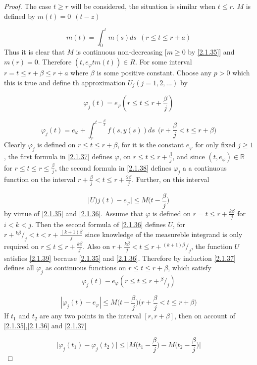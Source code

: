 \documentclass[a4 paper, 12pt]{report}
\newcommand*\rfrac[2]{{}^{#1}\!/_{#2}}
\theoremstyle{plain}
\begin{document}
\begin{proof}
The case $t\geq r$ will be considered, the situation is similar  when $t\leq r$. $M$ is defined by $m(t) = 0~~(t-z)$

\begin{equation}\label{2.1.36}
m(t) = \int_0^tm(s)ds~~(r\leq t\leq r+a)
\end{equation}
Thus it is clear that $M$ is continuous  non-decreasing $[m\geq 0$ by \eqref{2.1.35}] and $m(r) = 0$. Therefore $(t,e_\varphi tm(t))\in R$. For some interval $r = t\leq r+\beta\leq r+a$ where $\beta$ is some positive constant. Choose any $p>0$ which this is true and define th approximation $U_j(j = 1,2,\ldots)$ by

\begin{equation}\label{2.1.37}
\varphi_j(t) = e_\varphi(r\leq t\leq r+\frac{\beta}{j})
\end{equation}

\begin{equation}\label{2.1.38}
\varphi_j(t) = e_{\varphi}+\int_r^{t-\frac{\beta}{s}}f(s,y(s))ds~~\bigg(r+\frac{\beta}{j}<t\leq r+\beta\bigg)
\end{equation}
Clearly $\varphi_j$ is defined on $r\leq t\leq r+\beta$, for it is the constant  $e_{\varphi}$ for only fixed $j\geq 1$, the first formula in \eqref{2.1.37} defines $\varphi$, on $r\leq t \leq r + \frac{\beta}{j}$, and since $(t,e_\varphi)\in\mathbb{R}$ for $r\leq t\leq r\leq \frac{\beta}{j}$, the second formula  in \eqref{2.1.38} defines $\varphi_j$ a a continuous function on  the interval $r+\frac{\beta}{j}<t\leq r+\frac{2\beta}{j}$. Further, on this %
 interval

\begin{equation}\label{2.1.39}
\bigg|U)j(t) - e_\varphi\bigg|\leq M\bigg(t-\frac{\beta}{j}\bigg)
\end{equation}
by virtue of \eqref{2.1.35} and \eqref{2.1.36}. Assume that $\varphi$ is defined on $r = t\leq r+\frac{k\beta}{j}$ for $i<k<j$. Then the second formula of \eqref{2.1.36} defines $U$, for $r+\rfrac{k\beta}{j}<t<r+\frac{(k+1)\beta}{j}$ since knowledge of the measureble integrand is only required on $r\leq t\leq r+\frac{k\beta}{j}$. Also on $r+\frac{k\beta}{j}<t\leq r+\rfrac{(k+1)\beta}{j}$, the function $U$ satisfies \eqref{2.1.39} because \eqref{2.1.35} and \eqref{2.1.36}. Therefore by induction \eqref{2.1.37} defines all $\varphi_j$ as continuous functions on $r\leq t\leq r+\beta$, which satisfy 
$$
\varphi_j(t) - e_{\varphi}(r\leq t\leq r+\rfrac{\beta}{j})
$$

\begin{equation}\label{6.1.40}
|\varphi_j(t) - e_{\varphi}|\leq M\bigg(t - \frac{\beta}{j}\bigg)\bigg(r+\frac{\beta}{j}<t\leq r+\beta\bigg)
\end{equation}
If $t_1$ and $t_2$ are any two points in the interval $[r,r+\beta]$, then on account of \eqref{2.1.35},\eqref{2.1.36} and \eqref{2.1.37}

\begin{equation}\label{2.1.41}
\bigg|\varphi_j(t_1) - \varphi_j(t_2)\bigg|\leq \bigg|M\bigg(t_1 - \frac{\beta}{j}\bigg) - M\bigg(t_2 - \frac{\beta}{j}\bigg)\bigg|
\end{equation}
\end{proof}
\end{document}
